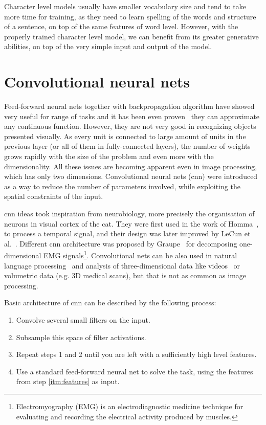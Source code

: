 Character level models usually have smaller vocabulary size and tend to take more time for training, as they need to learn spelling of the words and structure of a sentence, on top of the same features of word level. However, with the properly trained character level model, we can benefit from its greater generative abilities, on top of the very simple input and output of the model.

\section{Convolutional neural nets}

Feed-forward neural nets together with backpropagation algorithm have showed very useful for range of tasks and it has been even proven~\cite{cybenko:mcss,journals/nn/Hornik91} they can approximate any continuous function. However, they are not very good in recognizing objects presented visually. As every unit is connected to large amount of units in the previous layer (or all of them in fully-connected layers), the number of weights grows rapidly with the size of the problem and even more with the dimensionality. All these issues are becoming apparent even in image processing, which has only two dimensions. Convolutional neural nets (\gls{cnn}) were introduced as a way to reduce the number of parameters involved, while exploiting the spatial constraints of the input.

\gls{cnn} ideas took inspiration from neurobiology, more precisely the organisation of neurons in visual cortex of the cat. They were first used in the work of Homma~\cite{NIPS1987_20}, to process a temporal signal, and their design was later improved by LeCun et al.~\cite{lecun-98}. Different \gls{cnn} architecture was proposed by Graupe~\cite{graupe1988} for decomposing one-dimensional EMG signals\footnote{Electromyography (EMG) is an electrodiagnostic medicine technique for evaluating and recording the electrical activity produced by muscles.}. Convolutional nets can be also used in natural language processing~\cite{DBLP:journals/corr/Kim14f} and analysis of three-dimensional data like videos~\cite{10.1109/TPAMI.2012.59} or volumetric data (e.g. 3D medical scans), but that is not as common as image processing.

Basic architecture of \gls{cnn} can be described by the following process:

\begin{minipage}{0.9\textwidth}
\begin{enumerate}
	\setlength\itemsep{4mm}
	\item Convolve several small filters on the input.
	\item Subsample this space of filter activations.
	\item Repeat steps 1 and 2 until you are left with a sufficiently high level features.\label{itm:features}
	\item Use a standard feed-forward neural net to solve the task, using the features from step \ref{itm:features} as input.
\end{enumerate}
\end{minipage}
\vspace{9mm}

